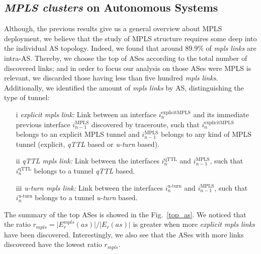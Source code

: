 \subsection{\textit{MPLS clusters} on Autonomous Systems}\label{cluster.as}
Although, the previous results give us a general overview about MPLS deployment,
we believe that the study of MPLS structure requires some deep into the
individual AS topology. Indeed, we found that around $89.9\%$ of \textit{mpls
links} are intra-AS. Thereby, we choose the top of ASes according to the total
number of discovered links; and in order to focus our analysis on those ASes
were MPLS is relevant, we discarded those having less than five hundred
\textit{mpls links}. Additionally, we identified  the amount of \textit{mpls
links} by AS, distinguishing the type of tunnel:

\begin{itemize}
  \item[i] \textit{explicit mpls link:} Link between an interface
  $i^{\text{explicitMPLS}}_{n}$  and its immediate previous interface
  $i^{\text{MPLS}}_{n-1}$ discovered by traceroute, such that
  $i^{\text{explicitMPLS}}_{n}$ belongs to an explicit MPLS tunnel and
  $i^{\text{MPLS}}_{n-1}$ belongs to any kind of MPLS tunnel (explicit,
  \textit{qTTL} based or \textit{u-turn} based).
  \item[ii] \textit{qTTL mpls link:} Link between the interfaces
  $i^{\text{qTTL}}_{n}$  and $i^{\text{MPLS}}_{n-1}$, such that
  $i^{\text{qTTL}}_{n}$ belongs to a tunnel \textit{qTTL} based.
  \item[iii] \textit{u-turn mpls link:} Link between the interfaces
  $i^{\text{u-turn}}_{n}$  and $i^{\text{MPLS}}_{n-1}$, such that
  $i^{\text{u-turn}}_{n}$ belongs to a tunnel \textit{u-turn} based.
\end{itemize}

The summary of the top ASes is showed in the Fig.~\ref{top_as}.
We noticed that the ratio $r_{mpls}= \vert E^{mpls}_{r} (as) \vert /\vert E_{r}
(as) \vert $  is greater when more  \textit{explicit mpls links} have been
discovered. Interestingly, we also see that the ASes with more links discovered
have the lowest ratio $r_{mpls}$.

